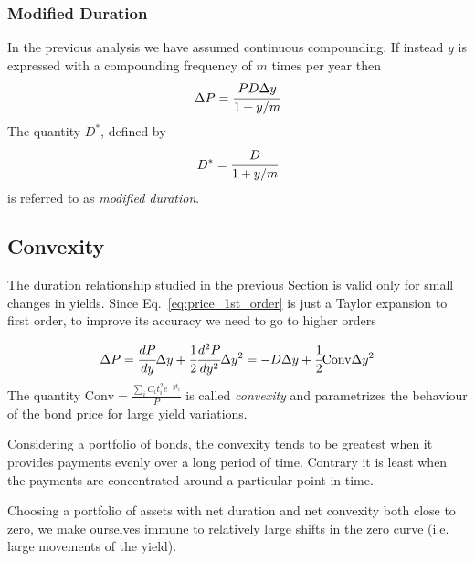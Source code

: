 \subsubsection{Modified Duration}
In the previous analysis we have assumed continuous compounding. If instead $y$ is expressed with a compounding frequency of $m$ times per year then 
\begin{equation}
\Delta P = \cfrac{PD\Delta y}{1+y/m}
\end{equation}
\noindent
The quantity $D^{*}$, defined by
\begin{equation}
D^{*} = \cfrac{D}{1+y/m}
\end{equation}
\noindent
is referred to as \emph{modified duration}. 

\subsection{Convexity}
The duration relationship studied in the previous Section is valid only for small changes in yields. Since Eq.~\ref{eq:price_1st_order} is just a Taylor expansion to first order, to improve its accuracy we need to go to higher orders

\begin{equation}
\Delta P = \cfrac{dP}{dy}\Delta y + \cfrac{1}{2} \cfrac{d^2 P}{dy^2}\Delta y^2 = -D\Delta y + \cfrac{1}{2} \textrm{Conv} \Delta y^2 
\end{equation}
\noindent
The quantity $\textrm{Conv} = \frac{\sum_i C_i t_i^2 e^{-yt_i}}{P}$ is called \emph{convexity} and parametrizes the behaviour of the bond price for large yield variations.

Considering a portfolio of bonds, the convexity tends to be greatest when it provides payments evenly over a long period of time. Contrary it is least when the payments are concentrated around a particular point in time. 

Choosing a portfolio of assets with net duration and net convexity both close to zero, we make ourselves immune to relatively large shifts in the zero curve (i.e. large movements of the yield).


